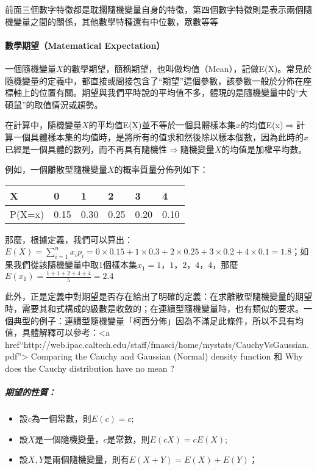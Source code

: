 \documentclass[11pt]{article}
\providecommand{\tightlist}{%
      \setlength{\itemsep}{0pt}\setlength{\parskip}{0pt}}
\begin{document}
前面三個數字特徵都是耽擱隨機變量自身的特徵，第四個數字特徵則是表示兩個隨機變量之間的關係，其他數學特種還有中位數，眾數等等

    \hypertarget{ux6578ux5b78ux671fux671bmatematical-expectation}{%
\paragraph{數學期望（Matematical
Expectation）}\label{ux6578ux5b78ux671fux671bmatematical-expectation}}

一個隨機變量\(X\)的數學期望，簡稱期望，也叫做均值（Mean），記做E(X)。常見於隨機變量的定義中，都直接或間接包含了``期望''這個參數，該參數一般於分佈在座標軸上的位置有關。期望與我們平時說的平均值不多，體現的是隨機變量中的``大碩鼠''的取值情況或趨勢。

在計算中，隨機變量\(X\)的平均值E(X)並不等於一個具體樣本集\(x\)的均值E(x)\(\Rightarrow\)計算一個具體樣本集的均值時，是將所有的值求和然後除以樣本個數，因為此時的\(x\)已經是一個具體的數列，而不再具有隨機性\(\Rightarrow\)隨機變量\(X\)的均值是加權平均數。

例如，一個離散型隨機變量\(X\)的概率質量分佈列如下：

\begin{longtable}[]{@{}llllll@{}}
\toprule
X & 0 & 1 & 2 & 3 & 4\tabularnewline
\midrule
\endhead
P(X=x) & 0.15 & 0.30 & 0.25 & 0.20 & 0.10\tabularnewline
\bottomrule
\end{longtable}

那麼，根據定義，我們可以算出：\(E(X) = \displaystyle \sum_{ i = 1 }^{ n } x_i p_i = 0 \times 0.15 + 1 \times 0.3 + 2 \times 0.25 + 3 \times 0.2 + 4 \times 0.1 = 1.8\)；如果我們從該隨機變量中取1個樣本集\(x_1 = 1，1，2，4，4\)，那麼\(E(x_1) = \frac{1 + 1 + 2 + 4 + 4}{5} = 2.4\)

    此外，正是定義中對期望是否存在給出了明確的定義：在求離散型隨機變量的期望時，需要其和式構成的級數是收斂的；在連續型隨機變量時，也有類似的要求。一個典型的例子：連續型隨機變量「柯西分佈」因為不滿足此條件，所以不具有均值，具體解釋可以參考：\textless{}a
href``http://web.ipac.caltech.edu/staff/fmasci/home/mystats/CauchyVsGaussian.pdf''\textgreater{}
Comparing the Cauchy and Gaussian (Normal) density function 和 Why does
the Cauchy distribution have no mean ? 

    \hypertarget{ux671fux671bux7684ux6027ux8cea}{%
\subparagraph{期望的性質：}\label{ux671fux671bux7684ux6027ux8cea}}

\begin{itemize}
\tightlist
\item
  設\(c\)為一個常數，則\(E(c) = c\);
\item
  設\(X\)是一個隨機變量，\(c\)是常數，則\(E(cX) = cE(X)\);
\item
  設\(X,Y\)是兩個隨機變量，則有\(E(X + Y) = E(X) + E(Y)\)；
\end{itemize}
\end{document}
